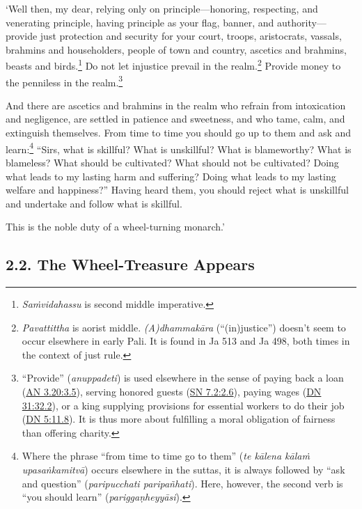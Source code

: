 \documentclass[12pt,openany]{book}%
\begin{document}
‘Well then, my dear, relying only on principle—honoring, respecting, and venerating principle, having principle as your flag, banner, and authority—provide just protection and security for your court, troops, aristocrats, vassals, brahmins and householders, people of town and country, ascetics and brahmins, beasts and birds.\footnote{\textit{\textsanskrit{Saṁvidahassu}} is second middle imperative. } Do not let injustice prevail in the realm.\footnote{\textit{Pavattittha} is aorist middle. \textit{(A)\textsanskrit{dhammakāra}} (“(in)justice”) doesn’t seem to occur elsewhere in early Pali. It is found in Ja 513 and Ja 498, both times in the context of just rule. } Provide money to the penniless in the realm.\footnote{“Provide” (\textit{anuppadeti}) is used elsewhere in the sense of paying back a loan (\href{https://suttacentral.net/an3.20/en/sujato\#3.5}{AN 3.20:3.5}), serving honored guests (\href{https://suttacentral.net/sn7.2/en/sujato\#2.6}{SN 7.2:2.6}), paying wages (\href{https://suttacentral.net/dn31/en/sujato\#32.2}{DN 31:32.2}), or a king supplying provisions for essential workers to do their job (\href{https://suttacentral.net/dn5/en/sujato\#11.8}{DN 5:11.8}). It is thus more about fulfilling a moral obligation of fairness than offering charity. } 

And there are ascetics and brahmins in the realm who refrain from intoxication and negligence, are settled in patience and sweetness, and who tame, calm, and extinguish themselves. From time to time you should go up to them and ask and learn:\footnote{Where the phrase “from time to time go to them” (\textit{te \textsanskrit{kālena} \textsanskrit{kālaṁ} \textsanskrit{upasaṅkamitvā}}) occurs elsewhere in the suttas, it is always followed by “ask and question” (\textit{paripucchati \textsanskrit{paripañhati}}). Here, however, the second verb is “you should learn” (\textit{\textsanskrit{pariggaṇheyyāsi}}). } “Sirs, what is skillful? What is unskillful? What is blameworthy? What is blameless? What should be cultivated? What should not be cultivated? Doing what leads to my lasting harm and suffering? Doing what leads to my lasting welfare and happiness?” Having heard them, you should reject what is unskillful and undertake and follow what is skillful. 

This is the noble duty of a wheel-turning monarch.’ 

\subsection*{2.2. The Wheel-Treasure Appears }
\end{document}
